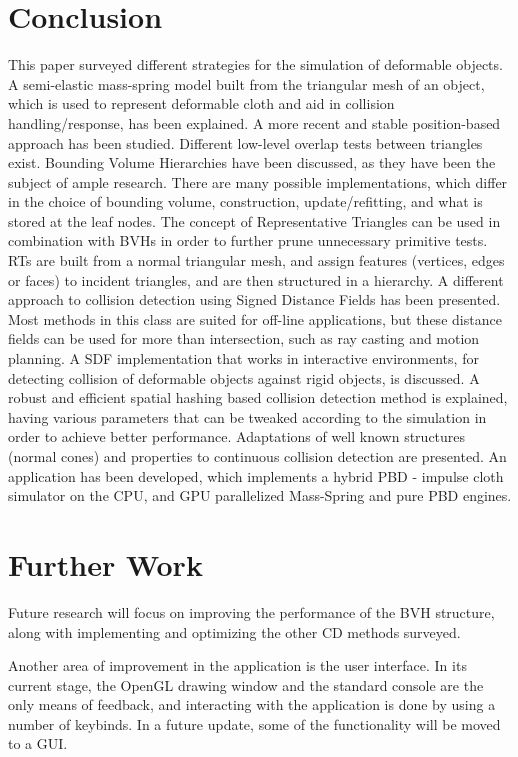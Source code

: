 \FloatBarrier
\chapter{Conclusion}
\label{section:conclusion}

This paper surveyed different strategies for the simulation of deformable objects. A semi-elastic mass-spring model built from the triangular mesh of an object, which is used to represent deformable cloth and aid in collision handling/response, has been explained. A more recent and stable position-based approach has been studied. Different low-level overlap tests between triangles exist. Bounding Volume Hierarchies have been discussed, as they have been the subject of ample research. There are many possible implementations, which differ in the choice of bounding volume, construction, update/refitting, and what is stored at the leaf nodes. The concept of Representative Triangles can be used in combination with BVHs in order to further prune unnecessary primitive tests. RTs are built from a normal triangular mesh, and assign features (vertices, edges or faces) to incident triangles, and are then structured in a hierarchy. A different approach to collision detection using Signed Distance Fields has been presented. Most methods in this class are suited for off-line applications, but these distance fields can be used for more than intersection, such as ray casting and motion planning. A SDF implementation that works in interactive environments, for detecting collision of deformable objects against rigid objects, is discussed. A robust and efficient spatial hashing based collision detection method is explained, having various parameters that can be tweaked according to the simulation in order to achieve better performance. Adaptations of well known structures (normal cones) and properties to continuous collision detection are presented. An application has been developed, which implements a hybrid PBD - impulse cloth simulator on the CPU, and GPU parallelized Mass-Spring and pure PBD engines.

\chapter{Further Work}
\label{section:further}

Future research will focus on improving the performance of the BVH structure, along with implementing and optimizing the other CD methods surveyed. 

Another area of improvement in the application is the user interface. In its current stage, the OpenGL drawing window and the standard console are the only means of feedback, and interacting with the application is done by using a number of keybinds. In a future update, some of the functionality will be moved to a GUI.

